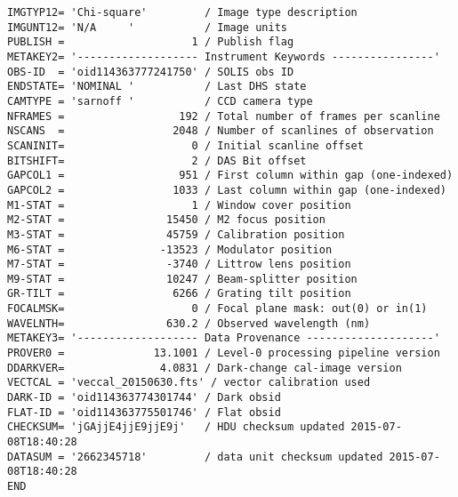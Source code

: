 \documentclass[11pt]{article}
\begin{document}
\begin{verbatim}
IMGTYP12= 'Chi-square'         / Image type description
IMGUNT12= 'N/A     '           / Image units
PUBLISH =                    1 / Publish flag
METAKEY2= '------------------- Instrument Keywords ----------------'
OBS-ID  = 'oid114363777241750' / SOLIS obs ID
ENDSTATE= 'NOMINAL '           / Last DHS state
CAMTYPE = 'sarnoff '           / CCD camera type
NFRAMES =                  192 / Total number of frames per scanline
NSCANS  =                 2048 / Number of scanlines of observation
SCANINIT=                    0 / Initial scanline offset
BITSHIFT=                    2 / DAS Bit offset
GAPCOL1 =                  951 / First column within gap (one-indexed)
GAPCOL2 =                 1033 / Last column within gap (one-indexed)
M1-STAT =                    1 / Window cover position
M2-STAT =                15450 / M2 focus position
M3-STAT =                45759 / Calibration position
M6-STAT =               -13523 / Modulator position
M7-STAT =                -3740 / Littrow lens position
M9-STAT =                10247 / Beam-splitter position
GR-TILT =                 6266 / Grating tilt position
FOCALMSK=                    0 / Focal plane mask: out(0) or in(1)
WAVELNTH=                630.2 / Observed wavelength (nm)
METAKEY3= '------------------- Data Provenance --------------------'
PROVER0 =              13.1001 / Level-0 processing pipeline version
DDARKVER=               4.0831 / Dark-change cal-image version
VECTCAL = 'veccal_20150630.fts' / vector calibration used
DARK-ID = 'oid114363774301744' / Dark obsid
FLAT-ID = 'oid114363775501746' / Flat obsid
CHECKSUM= 'jGAjjE4jjE9jjE9j'   / HDU checksum updated 2015-07-08T18:40:28
DATASUM = '2662345718'         / data unit checksum updated 2015-07-08T18:40:28
END
\end{verbatim}


%



{}
\end{document}
